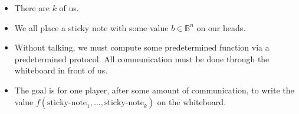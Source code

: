 \begin{itemize}
\item There are $k$ of us.
\item We all place a sticky note with some value $b \in \mathbb{B}^n$ on our heads. 
\item Without talking, we must compute some predetermined function via a predetermined protocol. All communication must be done through the whiteboard in front of us.
\item The goal is for one player, after some amount of communication, to write the value $f(\text{sticky-note}_1, ..., \text{sticky-note}_k)$ on the whiteboard.
\end{itemize}